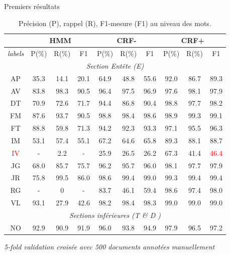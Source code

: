 \documentclass[newPxFont,pagenumber]{beamer}
\begin{document}
\begin{frame}[c]{Premiers résultats \cite{tagny2017sectNerhmmcrf}}
\begin{table}[!htb]
\scriptsize

\centering
\begin{tabular}{|c|c|c|c|c|c|c|c|c|c|}
\hline
 & \multicolumn{3}{c|}{HMM}  & \multicolumn{3}{c|}{CRF-}  & \multicolumn{3}{c|}{CRF+} \\
\hline
\textit{labels} & P($\%$) & R($\%$) & F1 & P($\%$) & R($\%$) & F1 & P($\%$) & R($\%$) & F1 \\
\hline
 \multicolumn{10}{|c|}{\textit{\textit{Section Entête (E)}}} \\
\hline
 AP & 35.3 &  14.1 & 20.1  & 64.9 & 48.8 & 55.6 & 92.0 & 86.7 & 89.3 \\
\hline
 AV & 83.8 &  98.3 & 90.5  & 96.4 & 97.5 & 96.9 & 97.6 & 98.1 & 97.9 \\
 \hline
 DT & 70.9 & 72.6 & 71.7  & 94.4 & 86.8 & 90.4 & 98.8 & 97.7 & 98.2 \\
 \hline
FM & 87.6 &  93.7 & 90.5  & 98.8 & 98.4 & 98.6 & 98.9 & 99.3 & 99.1 \\
 \hline
FT &  88.8 & 59.8 & 71.3  & 94.2 & 92.3 & 93.3 & 97.1 & 95.5 & 96.3 \\
 \hline
IM  & 53.1 & 57.4 & 55.1  & 67.2 & 64.6 & 65.8 &  89.3 & 88.1 & 88.7  \\
 \hline
 \textcolor{red}{IV} & - & 2.2 & - & 25.9 & 26.5 & 26.2 & 67.3 & 41.4 & \textcolor{red}{46.4} \\
 \hline
JG  & 68.0 & 85.7 & 75.7  & 96.2 & 95.7 & 96.0 & 98.1 & 97.7 & 97.9 \\
 \hline
JR  & 75.8 & 99.5 & 86.0  & 98.6 & 99.4 & 99.0 & 99.3 & 99.4 & 99.4 \\
 \hline
RG  &  - & 0  & - & 83.7 & 46.1 & 59.4 & 98.6 & 97.4 & 98.0 \\
\hline
VL & 93.1 & 27.9 & 42.6  & 98.2 & 98.4 & 98.3 & 99.0 & 99.0 & 99.0 \\
\hline
 \multicolumn{10}{|c|}{\textit{\textit{Sections inférieures (T \& D )}}} \\
 \hline
NO & 92.9 & 90.9 & 91.9 & 96.0 & 93.8 & 94.9 & 97.9 & 96.5 & 97.2\\
\hline
\end{tabular}

 \textit{5-fold validation croisée avec 500 documents annotées manuellement}
\caption{Précision (P), rappel (R), F1-mesure (F1) au niveau des mots.}\label{prf-entity}
\end{table}
\end{frame}
\end{document}
